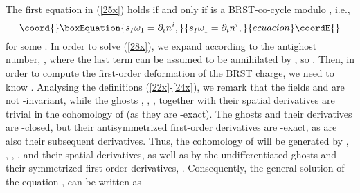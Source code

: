 \documentclass[a4paper,12pt]{article}
\begin{document}
The first equation in (\ref{25x}) holds if and only if \coordHE{} is a
BRST-co-cycle modulo \coordHE{}, i.e., 
\begin{equation}\coord{}\boxEquation{
s_{I}\omega _{1}=\partial _{i}n^{i},  \label{28x}
}{
s_{I}\omega _{1}=\partial _{i}n^{i},  }{ecuacion}\coordE{}\end{equation}
for some \coordHE{}. In order to solve (\ref{28x}), we expand \coordHE{}
according to the antighost number, \coordHE{}, where the last term can be assumed to be
annihilated by \coordHE{}, so \coordHE{}. Then, in order to compute the first-order deformation of
the BRST charge, we need to know \coordHE{}. Analysing
the definitions (\ref{22x}-\ref{24x}), we remark that the fields \coordHE{}
and \coordHE{} are not \coordHE{}-invariant,
while the ghosts \coordHE{}, \coordHE{}, \coordHE{}, together with
their spatial derivatives are trivial in the cohomology of \coordHE{} (as
they are \coordHE{}-exact). The ghosts \coordHE{} and their
derivatives are \coordHE{}-closed, but their antisymmetrized first-order
derivatives are \coordHE{}-exact, as are also their subsequent
derivatives. Thus, the cohomology of \coordHE{} will be generated by \coordHE{}, \coordHE{}, \coordHE{}, \coordHE{}, and their
spatial derivatives, as well as by the undifferentiated ghosts \coordHE{} and their symmetrized first-order derivatives, \coordHE{}. Consequently, the general solution
of the equation \coordHE{}, can be written as 
\end{document}
